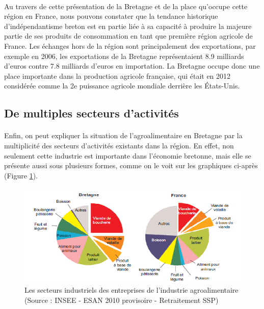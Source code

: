 \documentclass[a4paper,12pt]{report}
\begin{document}
			\paragraph{}Au travers de cette présentation de la Bretagne et de la place qu’occupe cette région en France, nous pouvons constater que la tendance historique d’indépendantisme breton est en partie liée à sa capacité à produire la majeure partie de ses produits de consommation en tant que première région agricole de France. Les échanges hors de la région sont principalement des exportations, par exemple en 2006, les exportations de la Bretagne représentaient 8.9 milliards d’euros contre 7.8 milliards d’euros en importation. La Bretagne occupe donc une place importante dans la production agricole française, qui était en 2012 considérée comme la 2e puissance agricole mondiale derrière les États-Unis.
			
		\subsection{De multiples secteurs d'activités}
			\paragraph{}Enfin, on peut expliquer la situation de l'agroalimentaire en Bretagne par la multiplicité des secteurs d'activités existants dans la région. En effet, non seulement cette industrie est importante dans l'économie bretonne, mais elle se présente aussi sous plusieurs formes, comme on le voit sur les graphiques ci-après (Figure \ref{SecteursIndustrielsIAA}).
			
			\begin{figure}[!h]
			\centering
			\includegraphics[scale=1]{Illustrations/SecteursIndustrielsIAA.png}
			\caption{Les secteurs industriels des entreprises de l'industrie agroalimentaire\\(Source : INSEE - ESAN 2010 provisoire - Retraitement SSP)}
			\label{SecteursIndustrielsIAA}
			\end{figure}
			
\end{document}
